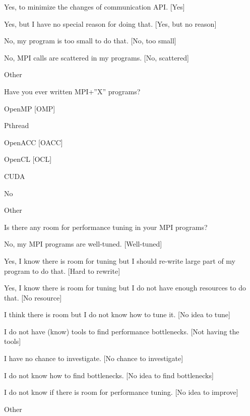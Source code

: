 \documentclass[preprint,5p,times]{elsarticle}
\begin{document}
{\begin{description}
    \begin{inparaenum}[{\bf C}1)]
    \item Yes, to minimize the changes of communication API. [Yes]
    \item Yes, but I have no special reason for doing that. [Yes, but no reason]
    \item No, my program is too small to do that. [No, too small]
    \item No, MPI calls are scattered in my programs. [No, scattered]
    \item Other
    \end{inparaenum}
  \item[Q22*:] Have you ever written MPI+”X” programs?
    \begin{inparaenum}[{\bf C}1)]
    \item OpenMP [OMP]
    \item Pthread
    \item OpenACC [OACC]
    \item OpenCL [OCL]
    \item CUDA
    \item No
    \item Other
    \end{inparaenum}
  \item[Q23:] Is there any room for performance tuning in your MPI programs?
    \begin{inparaenum}[{\bf C}1)]
    \item No, my MPI programs are well-tuned. [Well-tuned]
    \item Yes, I know there is room for tuning but I should re-write large
      part of my program to do that. [Hard to rewrite]
    \item Yes, I know there is room for tuning but I do not have enough resources to do that.
      [No resource]
    \item I think there is room but I do not know how to tune it.
      [No idea to tune]
    \item I do not have (know) tools to find performance bottlenecks.
      [Not having the tools]
    \item I have no chance to investigate.
      [No chance to investigate]
    \item I do not know how to find bottlenecks.
      [No idea to find bottlenecks]
    \item I do not know if there is room for performance tuning.
      [No idea to improve]
    \item Other
    \end{inparaenum}

\end{description}}
\end{document}
